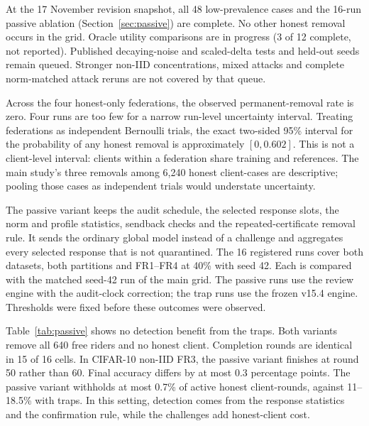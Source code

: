 \documentclass[journal]{IEEEtran}
\makeatletter
\renewcommand{\subsection}{\@startsection{subsection}{2}{\z@}{1.5ex}{0.7ex}{\normalfont\normalsize\itshape}}
\makeatother
\begin{document}


At the 17 November revision snapshot, all 48 low-prevalence cases and
the 16-run passive ablation (Section~\ref{sec:passive}) are complete.
No other honest removal occurs in the grid. Oracle utility comparisons
are in progress (3 of 12 complete, not reported). Published
decaying-noise and scaled-delta tests and held-out seeds remain queued.
Stronger non-IID concentrations, mixed attacks and complete norm-matched
attack reruns are not covered by that queue.

Across the four honest-only federations, the observed permanent-removal
rate is zero. Four runs are too few for a narrow run-level uncertainty
interval. Treating federations as independent Bernoulli trials, the exact
two-sided 95\% interval for the probability of any honest removal is
approximately $[0,0.602]$. This is not a client-level interval: clients
within a federation share training and references. The main study's
three removals among 6,240 honest client-cases are descriptive; pooling
those cases as independent trials would understate uncertainty.

\subsection{Passive Ordinary-Model Ablation}\label{sec:passive}
The passive variant keeps the audit schedule, the selected response
slots, the norm and profile statistics, sendback checks and the
repeated-certificate removal rule. It sends the ordinary global model
instead of a challenge and aggregates every selected response that is
not quarantined. The 16 registered runs cover both datasets, both
partitions and FR1--FR4 at 40\% with seed 42. Each is compared with the
matched seed-42 run of the main grid. The passive runs use the review
engine with the audit-clock correction; the trap runs use the frozen
v15.4 engine. Thresholds were fixed before these outcomes were observed.

Table~\ref{tab:passive} shows no detection benefit from the traps. Both
variants remove all 640 free riders and no honest client. Completion
rounds are identical in 15 of 16 cells. In CIFAR-10 non-IID FR3, the
passive variant finishes at round 50 rather than 60. Final accuracy
differs by at most 0.3 percentage points. The passive variant withholds
at most 0.7\% of active honest client-rounds, against 11--18.5\% with
traps. In this setting, detection comes from the response statistics and
the confirmation rule, while the challenges add honest-client cost.
\end{document}
